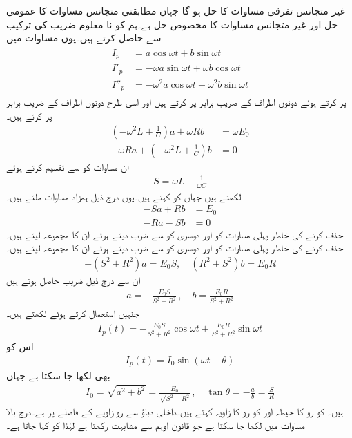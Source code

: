 غیر متجانس تفرقی مساوات  کا حل  ہو گا جہاں  مطابقتی متجانس مساوات کا عمومی حل اور  غیر متجانس مساوات کا مخصوص حل ہے۔ہم  کو نا معلوم  ضریب  کی ترکیب سے حاصل کرتے ہیں۔یوں مساوات  میں
\begin{gather}
\begin{aligned}
I_p&=a\cos \omega t+b\sin \omega t\\
I'_p&=-\omega a\sin \omega t+\omega b\cos \omega t\\
I''_p&=-\omega^2 a\cos \omega t-\omega^2 b\sin \omega t
\end{aligned}
\end{gather}
پر کرتے ہوئے دونوں اطراف  کے  ضریب  برابر پر کرتے ہیں اور اسی طرح دونوں اطراف   کے  ضریب  برابر پر کرتے ہیں۔
\begin{align*}
\left(-\omega^2 L+\frac{1}{C}\right)a+\omega R b&=\omega E_0\\
-\omega R a+\left(-\omega^2 L+\frac{1}{C}\right)b&=0
\end{align*}
ان مساوات کو  سے تقسیم کرتے ہوئے 
\begin{align}
S=\omega L-\tfrac{1}{\omega C}
\end{align}
 لکھتے ہیں جہاں  کو  کہتے ہیں۔یوں درج ذیل ہمزاد مساوات ملتے ہیں۔
\begin{align*}
-S a+R b&=E_0\\
-R a-S b&=0
\end{align*}
 حذف کرنے کی خاطر پہلی مساوات کو  اور دوسری کو  سے ضرب دیتے ہوئے ان کا مجموعہ لیتے ہیں۔ حذف کرنے کی خاطر پہلی مساوات کو  اور دوسری کو  سے ضرب دیتے ہوئے ان کا مجموعہ لیتے ہیں۔
\begin{align}
-(S^2+R^2)a=E_0S,\quad (R^2+S^2)b=E_0 R
\end{align}
ان سے درج ذیل  ضریب  حاصل ہوتے ہیں
 \begin{align}
a=-\frac{E_0S}{S^2+R^2}\, ,\quad b=\frac{E_0 R}{S^2+R^2}
\end{align}
جنہیں استعمال کرتے ہوئے  لکھتے ہیں۔
\begin{align}
I_p(t)=-\frac{E_0S}{S^2+R^2}\cos \omega t+\frac{E_0 R}{S^2+R^2} \sin \omega t
\end{align}
اس کو 
\begin{align}
I_p(t)=I_0\sin(\omega t-\theta)
\end{align}
بھی لکھا جا سکتا ہے جہاں
\begin{align}
I_0=\sqrt{a^2+b^2}=\frac{E_0}{\sqrt{S^2+R^2}}\, , \quad \tan \theta=-\frac{a}{b}=\frac{S}{R}
\end{align}
ہیں۔ کو رو کا حیطہ اور  کو رو کا زاویہ کہتے ہیں۔داخلی دباؤ سے رو  زاویے کے فاصلے پر ہے۔درج بالا مساوات میں  لکھا جا سکتا ہے  جو قانون اوہم سے مشابہت رکھتا ہے لہٰذا  کو  کہا جاتا ہے۔

